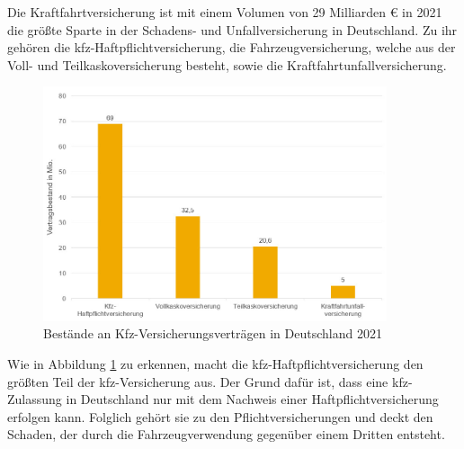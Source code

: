 
Die Kraftfahrtversicherung ist mit einem Volumen von 29 Milliarden € in 2021 die größte Sparte in der Schadens- und Unfallversicherung in Deutschland.\autocite[Vgl.][]{GDVSUV} Zu ihr gehören die \ac{kfz}-Haftpflichtversicherung, die Fahrzeugversicherung, welche aus der Voll- und Teilkaskoversicherung besteht, sowie die Kraftfahrtunfallversicherung.\autocite[Vgl.][S. 8]{MURINGER2000}

\begin{figure}[h]
    \centering
    \includegraphics[width=0.9\textwidth]{img/KfzV_Bestände_an_Verträgen_2021.jpg}
    \caption[Bestände an Kfz-Versicherungsverträgen in Deutschland 2021]{Bestände an Kfz-Versicherungsverträgen in Deutschland 2021\autocite{KfzVVBestand}}
    \label{fig:KfzVVBestand}
\end{figure}

Wie in Abbildung \ref{fig:KfzVVBestand} zu erkennen, macht die \ac{kfz}-Haftpflichtversicherung den größten Teil der \ac{kfz}-Versicherung aus. Der Grund dafür ist, dass eine \ac{kfz}-Zulassung in Deutschland nur mit dem Nachweis einer Haftpflichtversicherung erfolgen kann. Folglich gehört sie zu den Pflichtversicherungen und deckt den Schaden, der durch die Fahrzeugverwendung gegenüber einem Dritten entsteht. \autocite[Vgl.][S. 81]{STADLER2008}

